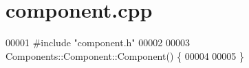 \section{component.\+cpp}
\label{component_8cpp_source}

\begin{DoxyCode}
00001 \textcolor{preprocessor}{#include "component.h"}
00002 
00003 Components::Component::Component() \{
00004     
00005 \}
\end{DoxyCode}

